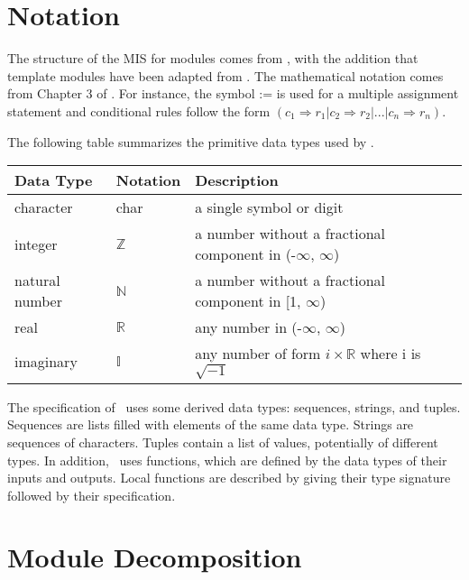 \documentclass[12pt, titlepage]{article}
\begin{document}
	\section{Notation}
	
	
	The structure of the MIS for modules comes from \citet{HoffmanAndStrooper1995},
	with the addition that template modules have been adapted from
	\cite{GhezziEtAl2003}.  The mathematical notation comes from Chapter 3 of
	\citet{HoffmanAndStrooper1995}.  For instance, the symbol := is used for a
	multiple assignment statement and conditional rules follow the form $(c_1
	\Rightarrow r_1 | c_2 \Rightarrow r_2 | ... | c_n \Rightarrow r_n )$.
	
	The following table summarizes the primitive data types used by \progname{}.
	
	\begin{center} \renewcommand{\arraystretch}{1.2} \noindent \begin{tabular}{l l
				p{7.5cm}} \toprule \textbf{Data Type} & \textbf{Notation} &
			\textbf{Description}\\ \midrule character & char & a single symbol or digit\\
			integer & $\mathbb{Z}$ & a number without a fractional component in (-$\infty$,
			$\infty$) \\ natural number & $\mathbb{N}$ & a number without a fractional
			component in [1, $\infty$) \\ real & $\mathbb{R}$ & any number in (-$\infty$,
			$\infty$)\\ imaginary& $\mathbb{I}$ & any number of form $i\times \mathbb{R}$
			where i is $\sqrt{-1}$ \\ \bottomrule \end{tabular} \end{center}
	
	\noindent The specification of \progname{} \ uses some derived data types:
	sequences, strings, and tuples. Sequences are lists filled with elements of the
	same data type. Strings are sequences of characters. Tuples contain a list of
	values, potentially of different types. In addition, \progname{} \ uses
	functions, which are defined by the data types of their inputs and outputs.
	Local functions are described by giving their type signature followed by their
	specification.
	
	\newpage \section{Module Decomposition}
	
\end{document}
